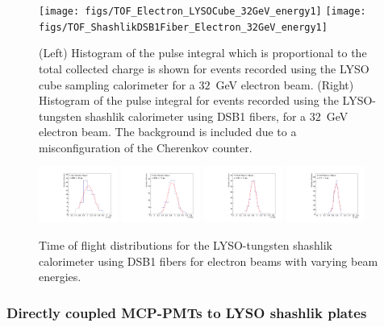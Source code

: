 \documentclass[12pt]{article}
\begin{document}
\begin{figure}[H] \centering
\texttt{[image: figs/TOF\_Electron\_LYSOCube\_32GeV\_energy1]} 
\texttt{[image: figs/TOF\_ShashlikDSB1Fiber\_Electron\_32GeV\_energy1]} 
\caption{ (Left) Histogram of the pulse integral which is proportional to the total collected charge is shown for events recorded using
the LYSO cube sampling calorimeter for a $32$~GeV electron beam. (Right) Histogram of the pulse integral for events recorded using
the LYSO-tungsten shashlik calorimeter using DSB1 fibers, for 
a $32$~GeV electron beam. The background is included due to a misconfiguration of the  Cherenkov counter. } 
\label{fig:ShashlikFiberEnergy32GeV}
\end{figure}



\begin{figure}[H] \centering
\includegraphics[width=0.23\textwidth]{figs/TOF_ShashlikDSB1Fiber_Electron_4GeV-2} 
\includegraphics[width=0.23\textwidth]{figs/TOF_ShashlikDSB1Fiber_Electron_8GeV-2} 
\includegraphics[width=0.23\textwidth]{figs/TOF_ShashlikDSB1Fiber_Electron_16GeV-2} 
\includegraphics[width=0.23\textwidth]{figs/TOF_ShashlikDSB1Fiber_Electron_32GeV-2} 
\caption{\small Time of flight distributions for the LYSO-tungsten shashlik calorimeter
using DSB1 fibers for electron beams with varying beam energies.} 
\label{fig:ShashlikFiberTOF}
\end{figure}


\subsubsection{Directly coupled MCP-PMTs to LYSO shashlik plates}
\end{document}

